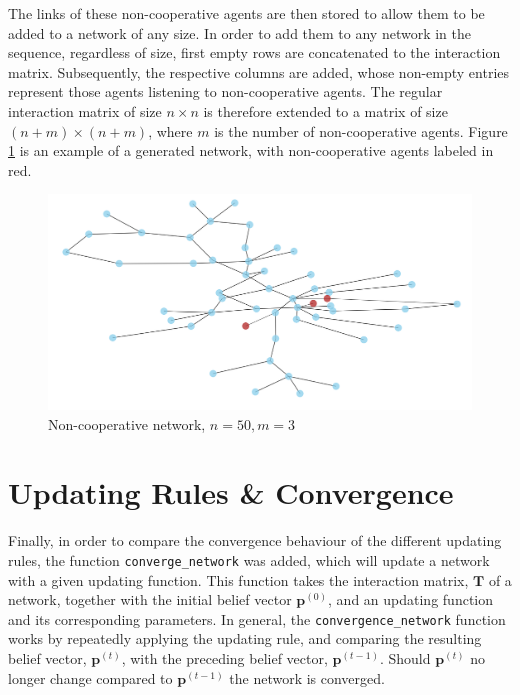 \documentclass[a4paper, 12pt]{report}
\newcommand{\T}{\bm{T}}
\begin{document}
\noindent The links of these non-cooperative agents are then stored to allow them to be added to a network of any size. In order to add them to any network in the sequence, regardless of size, first empty rows are concatenated to the interaction matrix. Subsequently, the respective columns are added, whose non-empty entries represent those agents listening to non-cooperative agents. The regular interaction matrix of size $n \times n$ is therefore extended to a matrix of size $(n+m) \times (n+m)$, where $m$ is the number of non-cooperative agents.
Figure \ref{network:noncoop} is an example of a generated network, with non-cooperative agents labeled in red.

\begin{center}
    \begin{figure}[!htbp]
        \centering
        \includegraphics[width=.75\textwidth]{ThesisKI/Images/NonCoopGraph_cropped.png}
        \caption{Non-cooperative network, $n=50, m=3$}
        \label{network:noncoop}
    \end{figure}
\end{center}

\section{Updating Rules \& Convergence}
\label{convergence:implementation}
Finally, in order to compare the convergence behaviour of the different updating rules, the function \texttt{converge\_network} was added, which will update a network with a given updating function. This function takes the interaction matrix, $\T$ of a network, together with the initial belief vector $\bm{p}^{(0)}$, and an updating function and its corresponding parameters. In general, the \texttt{convergence\_network} function works by repeatedly applying the updating rule, and comparing the resulting belief vector, $\bm{p}^{(t)}$, with the preceding belief vector, $\bm{p}^{(t-1)}$. Should $\bm{p}^{(t)}$ no longer change compared to $\bm{p}^{(t-1)}$ the network is converged.
\end{document}
